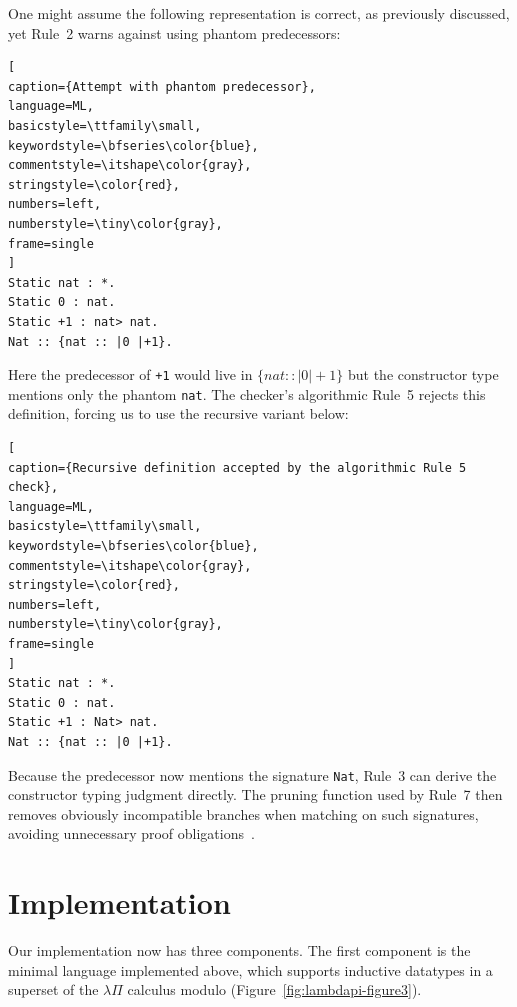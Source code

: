 \documentclass[a4paper, anonymous, UKenglish,cleveref, autoref, thm-restate]{lipics-v2021}
\begin{document}
One might assume the following representation is correct, as previously discussed, yet Rule~2 warns against using phantom predecessors:
	
\begin{lstlisting}[
caption={Attempt with phantom predecessor},
language=ML,
basicstyle=\ttfamily\small,
keywordstyle=\bfseries\color{blue},
commentstyle=\itshape\color{gray},
stringstyle=\color{red},
numbers=left,
numberstyle=\tiny\color{gray},
frame=single
]
Static nat : *.
Static 0 : nat.
Static +1 : nat> nat.
Nat :: {nat :: |0 |+1}.
\end{lstlisting}

Here the predecessor of \texttt{+1} would live in $\{nat :: |0 | +1\}$ but the constructor type mentions only the phantom \texttt{nat}. The checker's algorithmic Rule~5 rejects this definition, forcing us to use the recursive variant below:

\begin{lstlisting}[
caption={Recursive definition accepted by the algorithmic Rule 5 check},
language=ML,
basicstyle=\ttfamily\small,
keywordstyle=\bfseries\color{blue},
commentstyle=\itshape\color{gray},
stringstyle=\color{red},
numbers=left,
numberstyle=\tiny\color{gray},
frame=single
]
Static nat : *.
Static 0 : nat.
Static +1 : Nat> nat.
Nat :: {nat :: |0 |+1}.
\end{lstlisting}
Because the predecessor now mentions the signature \texttt{Nat}, Rule~3 can derive the constructor typing judgment directly. The pruning function used by Rule~7 then removes obviously incompatible branches when matching on such signatures, avoiding unnecessary proof obligations~\cite{martin2021intuitionistic}.

\section{Implementation}
\label{sec:implementation}
Our implementation now has three components.
The first component is the minimal language implemented above, which supports inductive datatypes in a superset of the $\lambda \Pi$ calculus modulo (Figure~\ref{fig:lambdapi-figure3}).
\end{document}
